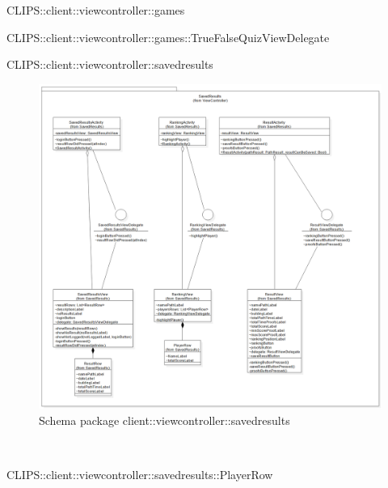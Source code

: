 \begin{componente}{CLIPS::client::viewcontroller::games}
\begin{compClassi}
\begin{classe}{CLIPS::client::viewcontroller::games::TrueFalseQuizViewDelegate}
\begin{classeRelazioni}
\end{classeRelazioni}
\end{classe}\end{compClassi}
\end{componente}
\begin{componente}{CLIPS::client::viewcontroller::savedresults}
\begin{figure}[h!]
\centering
\includegraphics[scale=0.4]{img/package/png/client--viewcontroller--savedresults.png}
\caption{Schema package client::viewcontroller::savedresults}
 \end{figure}
\begin{compClassi} \\
\begin{classe}{CLIPS::client::viewcontroller::savedresults::PlayerRow}

\end{classe}
\end{compClassi}
\end{componente}
